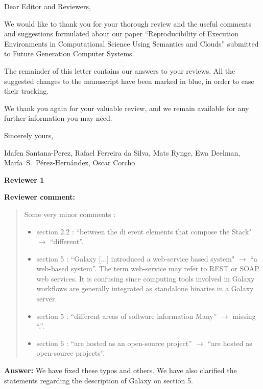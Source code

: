 \documentclass{letter}
\date{Nov XX, 2015}
\newenvironment{review}%
{\textbf{Reviewer comment:}\begin{quote}}%
{\end{quote}}%
\newcommand{\answer}[1]{%
      \textbf{Answer:} #1}
\begin{document}
\begin{letter}{}

\opening{Dear Editor and Reviewers,}

We would like to thank you for your thorough review and the useful
comments and suggestions formulated about our paper 
``Reproducibility of Execution Environments in Computational Science Using Semantics and Clouds'' 
submitted to Future Generation Computer Systems.

The remainder of this letter contains our answers to your reviews. All the suggested changes to the manuscript have been marked in blue, in order to ease their tracking.

We thank you again for your valuable review, and we remain available for any further information you may need.

\vspace{0.5cm}

Sincerely yours,

\vspace{1cm}

Idafen Santana-Perez, Rafael Ferreira da Silva, Mats Rynge, Ewa Deelman, Mar\'ia~S.~P\'erez-Hern\'andez, Oscar Corcho

\newpage


%
%
\textbf{Reviewer 1}

\begin{review}
Some very minor comments :
\begin{itemize}
        \item section 2.2 : ``between the di  erent elements that compose the Stack" $\rightarrow$ ``different''.
        \item section 5 : ``Galaxy [...] introduced a web-service based system" $\rightarrow$ ``a web-based system''. The term web-service may refer to REST or SOAP web services. It is confusing since computing tools involved in Galaxy workflows are generally integrated as standalone binaries in a Galaxy server.
        \item section 5 : ``different areas of software information Many'' $\rightarrow$ missing ``.''.
        \item section 6 : ``are hosted as an open-source project'' $\rightarrow$ ``are hosted as open-source projects''.
        \end{itemize}
\end{review}

\answer{We have fixed these typos and others. We have also clarified the statements regarding the description of Galaxy on section 5.}


\end{letter}
\end{document}
